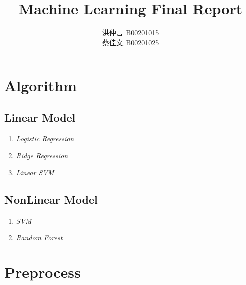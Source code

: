 \documentclass[12pt]{article}
\theoremstyle{definition}
\theoremstyle{remark}
\begin{document}

\title{Machine Learning Final Report}
\author{洪仲言 B00201015\\
蔡佳文 B00201025}
\maketitle
\section{Algorithm}
\subsection{Linear Model}
\begin{enumerate}
  \item {\em Logistic Regression\/}
  \item {\em Ridge Regression\/}
  \item {\em Linear SVM\/}
\end{enumerate}
\subsection{NonLinear Model}
\begin{enumerate}
  \item {\em SVM\/}
  \item {\em Random Forest\/}
\end{enumerate}
\section{Preprocess}
\end{document}
